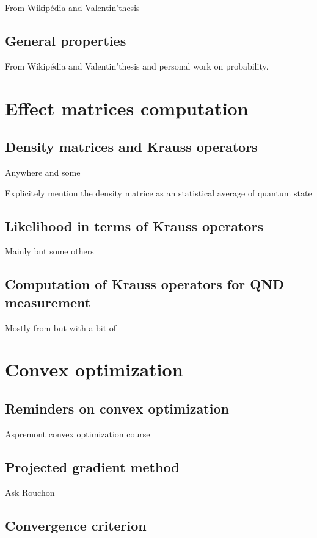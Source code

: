 \documentclass[10pt]{report}
\begin{document}
From Wikipédia and Valentin'thesis


\section{General properties}

From Wikipédia and Valentin'thesis and personal work on probability.

\chapter{Effect matrices computation}

\section{Density matrices and Krauss operators}

Anywhere and some \cite{Har06}

Explicitely mention the density matrice as an statistical average of quantum state

\section{Likelihood in terms of Krauss operators}

Mainly \cite{SPRQT16} but some others

\section{Computation of Krauss operators for QND measurement}
Mostly from \cite{VM19} but with a bit of \cite{Har06}

\chapter{Convex optimization}

\section{Reminders on convex optimization}

Aspremont convex optimization course

\section{Projected gradient method}

Ask Rouchon

\section{Convergence criterion}
\end{document}

